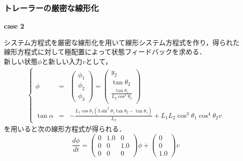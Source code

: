 \begin{frame}[t] 
\frametitle{トレーラーの厳密な線形化}

\noindent
{\bf case 2}

      システム方程式を厳密な線形化を用いて線形システム方程式を作り，得られた
      線形方程式に対して極配置によって状態フィードバックを求める．\\
      新しい状態$\phi$と新しい入力$v$として，
\begin{eqnarray*}
 \left\{
  \begin{array}{rcl}
   \phi &=& \left(
	     \begin{array}{c}
	      \phi_1 \\
	      \phi_2 \\
	      \phi_3
	     \end{array}
	    \right) = 
   \left(
    \begin{array}{c}
     y_2 \\
     \tan \theta_2 \\
     \frac{\tan \theta_1}{L_2 \cos ^3 \theta_2} \\
    \end{array}
   \right) \\
   \tan \alpha &=& \displaystyle
    -\frac{L_1 \cos \theta_1(3\sin ^2 \theta_1 \tan \theta_2 - \tan \theta_1)}
    {L_2} + L_1L_2 \cos ^3 \theta_1 \cos ^4 \theta_2 v
  \end{array}\right.
\end{eqnarray*}
を用いると次の線形方程式が得られる．
\begin{equation}
 \frac{d \phi}{dt} = \left(\begin{array}{ccc}
     0 & 1.0 & 0 \\
     0 & 0 & 1.0 \\
     0 & 0 & 0
   \end{array} \right) \phi + \left(\begin{array}{c}
     0 \\
     0 \\
     1.0
   \end{array} \right) v
\end{equation}
\end{frame}

